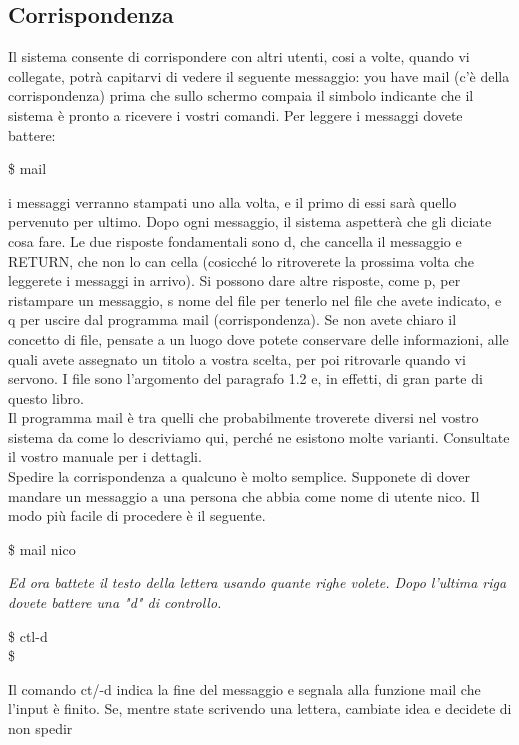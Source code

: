 \subsection{Corrispondenza}
Il sistema consente di corrispondere con altri utenti, cosi a volte, quando vi collegate,
potrà capitarvi di vedere il seguente messaggio: you have mail (c'è della corrispondenza)
prima che sullo schermo compaia il simbolo indicante che il sistema è pronto a ricevere
i vostri comandi. Per leggere i messaggi dovete battere:
\begin{description}
	\item[\$ mail] 
\end{description}
i messaggi verranno stampati uno alla volta, e il primo di essi sarà quello pervenuto
per ultimo. Dopo ogni messaggio, il sistema aspetterà che gli diciate cosa fare. Le due
risposte fondamentali sono d, che cancella il messaggio e RETURN, che non lo can
cella (cosicché lo ritroverete la prossima volta che leggerete i messaggi in arrivo). Si
possono dare altre risposte, come p, per ristampare un messaggio, s nome del file per tenerlo
nel file che avete indicato, e q per uscire dal programma mail (corrispondenza).
Se non avete chiaro il concetto di file, pensate a un luogo dove potete conservare delle
informazioni, alle quali avete assegnato un titolo a vostra scelta, per poi ritrovarle
quando vi servono. I file sono l'argomento del paragrafo 1.2 e, in effetti, di gran parte 
di questo libro.\\
Il programma mail è tra quelli che probabilmente troverete diversi nel vostro sistema
da come lo descriviamo qui, perché ne esistono molte varianti. Consultate il vostro
manuale per i dettagli.\\
Spedire la corrispondenza a qualcuno è molto semplice. Supponete di dover mandare
un messaggio a una persona che abbia come nome di utente nico. Il modo più facile
di procedere è il seguente.
\begin{description}
	\item[\$ mail nico] 
\end{description}
{\it Ed ora battete il testo della lettera usando quante righe volete. Dopo l'ultima riga dovete battere una "d"
	di controllo. }
\begin{description}
	\item[\$ ctl-d]
	\item[\$ ] 
\end{description}
Il comando ct/-d indica la fine del messaggio e segnala alla funzione mail che l'input è
finito. Se, mentre state scrivendo una lettera, cambiate idea e decidete di non spedir
